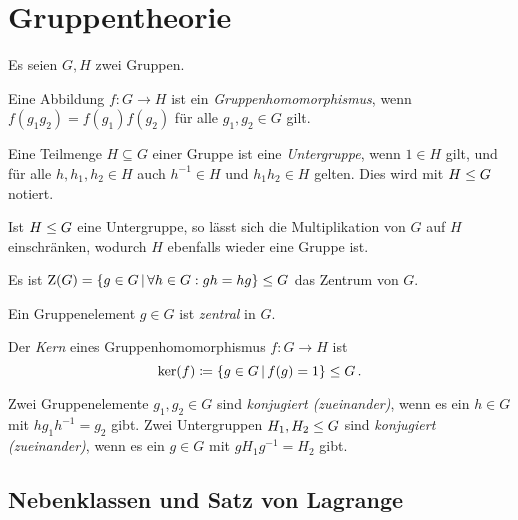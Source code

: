 \chapter{Gruppentheorie}

Es seien $G, H$ zwei Gruppen.

\begin{definition}
  Eine Abbildung $f \colon G \to H$ ist ein \emph{Gruppenhomomorphismus}, wenn $f(g_1 g_2) = f(g_1) f(g_2)$ für alle $g_1, g_2 \in G$ gilt.
\end{definition}

\begin{definition}
  Eine Teilmenge $H \subseteq G$ einer Gruppe ist eine \emph{Untergruppe}, wenn $1 \in H$ gilt, und für alle $h, h_1, h_2 \in H$ auch $h^{-1} \in H$ und $h_1 h_2 \in H$ gelten.
  Dies wird mit $H \mathrel{\leq} G$ notiert.
\end{definition}

Ist $H \mathrel{\leq} G$ eine Untergruppe, so lässt sich die Multiplikation von $G$ auf $H$ einschränken, wodurch $H$ ebenfalls wieder eine Gruppe ist.

\begin{example}
  Es ist $\groupcenter{G} = \{g \in G \suchthat \forall h \in G: gh = hg\} \subgroup G$ das Zentrum von $G$.
\end{example}

\begin{definition}
  Ein Gruppenelement $g \in G$ ist \emph{zentral} in $G$.
\end{definition}

\begin{definition}
  Der \emph{Kern} eines Gruppenhomomorphismus $f \colon G \to H$ ist
  \[
              \ker(f)
    \defined  \{
                g \in G
              \suchthat
                f(g) = 1
              \}
    \subgroup G \,.
  \]
\end{definition}

\begin{definition}
  Zwei Gruppenelemente $g_1, g_2 \in G$ sind \emph{konjugiert \textup(zueinander\textup)}, wenn es ein $h \in G$ mit $h g_1 h^{-1} = g_2$ gibt.
  Zwei Untergruppen $H_1, H_2 \mathrel{\leq} G$ sind \emph{konjugiert \textup(zueinander\textup)}, wenn es ein $g \in G$ mit $g H_1 g^{-1} = H_2$ gibt.
\end{definition}





\section{Nebenklassen und Satz von Lagrange}

